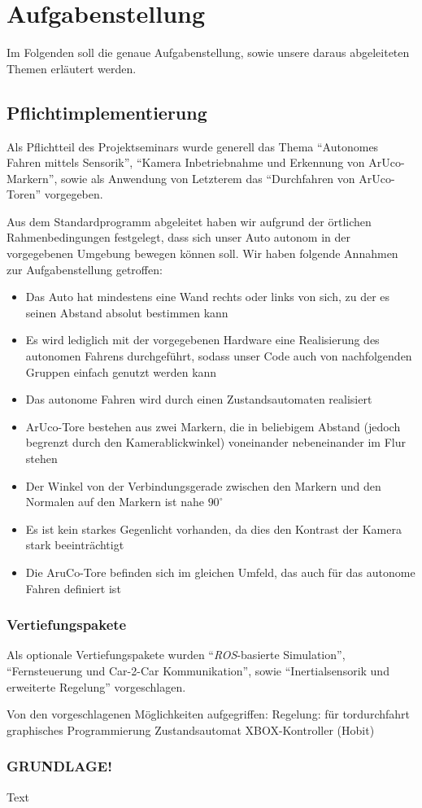 \section{Aufgabenstellung}
\label{sec:aufgabenstellung}

Im Folgenden soll die genaue Aufgabenstellung, sowie unsere daraus abgeleiteten Themen erläutert werden.

\subsection{Pflichtimplementierung}
Als Pflichtteil des Projektseminars wurde generell das Thema "`Autonomes Fahren mittels Sensorik"', "`Kamera Inbetriebnahme und Erkennung von ArUco-Markern"', sowie als Anwendung von Letzterem das "`Durchfahren von ArUco-Toren"' vorgegeben.  

Aus dem Standardprogramm abgeleitet haben wir aufgrund der örtlichen Rahmenbedingungen festgelegt, dass sich unser Auto autonom in der vorgegebenen Umgebung bewegen können soll. 
Wir haben folgende Annahmen zur Aufgabenstellung getroffen:
\begin{itemize}
	\item Das Auto hat mindestens eine Wand rechts oder links von sich, zu der es seinen Abstand absolut bestimmen kann
	\item Es wird lediglich mit der vorgegebenen Hardware eine Realisierung des autonomen Fahrens durchgeführt, sodass unser Code auch von nachfolgenden Gruppen einfach genutzt werden kann
	\item Das autonome Fahren wird durch einen Zustandsautomaten realisiert
	\item ArUco-Tore bestehen aus zwei Markern, die in beliebigem Abstand (jedoch begrenzt durch den Kamerablickwinkel) voneinander nebeneinander im Flur stehen
	\item Der Winkel von der Verbindungsgerade zwischen den Markern und den Normalen auf den Markern ist nahe $90^\circ$
	\item Es ist kein starkes Gegenlicht vorhanden, da dies den Kontrast der Kamera stark beeinträchtigt
	\item Die AruCo-Tore befinden sich im gleichen Umfeld, das auch für das autonome Fahren definiert ist
\end{itemize}

\subsubsection{Vertiefungspakete}
Als optionale Vertiefungspakete wurden "`\textit{ROS}-basierte Simulation"', "`Fernsteuerung und Car-2-Car Kommunikation"', sowie "`Inertialsensorik und erweiterte Regelung"' vorgeschlagen.

Von den vorgeschlagenen Möglichkeiten aufgegriffen:
Regelung: für tordurchfahrt
graphisches Programmierung
Zustandsautomat
XBOX-Kontroller (Hobit)


\subsubsection{GRUNDLAGE!}
Text
